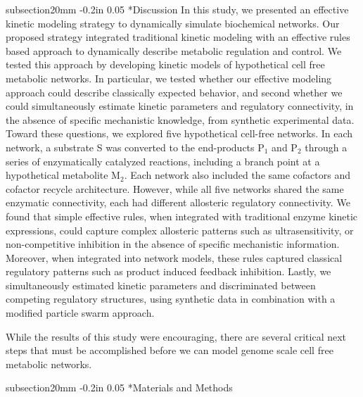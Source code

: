 \documentclass[12pt]{article}
\makeatletter
\renewcommand\section{\@startsection
	{subsection}{2}{0mm}
	{-0.2in}
	{0.05\baselineskip}
	{\normalfont\large\bfseries}}
\makeatother
\begin{document}
\section*{Discussion}
In this study, we presented an effective kinetic modeling strategy to dynamically simulate biochemical networks. 
Our proposed strategy integrated traditional kinetic modeling with an effective rules based approach to dynamically describe metabolic regulation and control.
We tested this approach by developing kinetic models of hypothetical cell free metabolic networks. 
In particular, we tested whether our effective modeling approach could describe classically expected behavior, 
and second whether we could simultaneously estimate kinetic parameters and regulatory connectivity, in the absence of specific mechanistic knowledge, 
from synthetic experimental data. Toward these questions, we explored five hypothetical cell-free networks. In each network, a
substrate S was converted to the end-products P$_{1}$ and P$_{2}$ through a series of enzymatically catalyzed reactions, 
including a branch point at a hypothetical metabolite M$_{2}$. Each network also included the same cofactors and cofactor recycle architecture. 
However, while all five networks shared the same enzymatic connectivity, each had different allosteric regulatory connectivity. 
We found that simple effective rules, when integrated with traditional enzyme kinetic expressions, could
capture complex allosteric patterns such as ultrasensitivity, or non-competitive inhibition in the absence of specific mechanistic information. 
Moreover, when integrated into network models, these rules captured classical regulatory patterns such as product induced feedback inhibition. 
Lastly, we simultaneously estimated kinetic parameters and discriminated between competing regulatory structures, using synthetic data in combination with a
modified particle swarm approach.



While the results of this study were encouraging, there are several critical next steps that must be accomplished before we can model genome scale cell free metabolic networks.

\clearpage

\section*{Materials and Methods}
\end{document}
